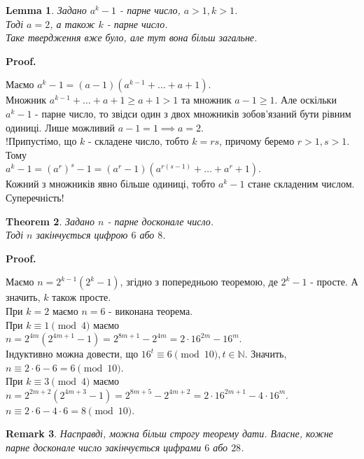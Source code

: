 \documentclass[a4paper, 10pt]{article}
\makeatletter
\theoremstyle{theoremdd}
\newtheorem{theorem}{Theorem}[subsection]
\theoremstyle{theoremdd}
\theoremstyle{theoremdd}
\theoremstyle{theoremdd}
\theoremstyle{theoremdd}
\theoremstyle{theoremdd}
\newtheorem{remark}[theorem]{Remark}
\theoremstyle{theoremdd}
\newtheorem{lemma}[theorem]{Lemma}
\theoremstyle{theoremdd}
\renewenvironment{proof}[1][Proof.\\]{\par
\pushQED{\hfill \qed}%
\normalfont \topsep6\p@\@plus6\p@\relax
\trivlist
\item\relax
{\bfseries
#1\@addpunct{.}}\hspace\labelsep\ignorespaces
}{%
\popQED\endtrivlist\@endpefalse
}
\makeatother
\begin{document}
\begin{lemma}
Задано $a^k-1$ - парне число, $a>1, k>1$.\\
Тоді $a = 2$, а також $k$ - парне число.\\
\textit{Таке твердження вже було, але тут вона більш загальне.}
\end{lemma}

\begin{proof}
Маємо $a^k-1=(a-1)(a^{k-1}+\dots+a+1).$\\
Множник $a^{k-1}+\dots +a+1 \geq a+1>1$ та множник $a-1\geq 1$. Але оскільки $a^k-1$ - парне число, то звідси один з двох множників зобов'язаний бути рівним одиниці. Лише можливий $a-1=1 \implies a =2$.\\
!Припустімо, що $k$ - складене число, тобто $k = rs$, причому беремо $r>1,s>1$. Тому\\
$a^k-1=(a^r)^s-1 = (a^r-1)(a^{r(s-1)}+ \dots + a^r+1)$.\\
Кожний з множників явно більше одиниці, тобто $a^k-1$ стане складеним числом. Суперечність!
\end{proof}

\begin{theorem}
Задано $n$ - парне досконале число.\\
Тоді $n$ закінчується цифрою $6$ або $8$.
\end{theorem}

\begin{proof}
Маємо $n = 2^{k-1}(2^k-1)$, згідно з попередньою теоремою, де $2^k-1$ - просте. А значить, $k$ також просте.\\
При $k = 2$ маємо $n = 6$ - виконана теорема.\\
При $k \equiv 1 \pmod 4$ маємо\\
$n = 2^{4m}(2^{4m+1}-1) = 2^{8m+1} - 2^{4m} = 2 \cdot 16^{2m} - 16^m$.\\
Індуктивно можна довести, що $16^t \equiv 6 \pmod {10}, t \in \mathbb{N}$. Значить, \\
$n \equiv 2 \cdot 6 - 6 = 6 \pmod {10}$.\\
При $k \equiv 3 \pmod 4$ маємо\\
$n = 2^{2m+2}(2^{4m+3}-1) = 2^{8m+5} - 2^{4m+2} = 2 \cdot 16^{2m+1} - 4 \cdot 16^m$.\\
$n \equiv 2 \cdot 6 - 4 \cdot 6 = 8 \pmod {10}$.
\end{proof}

\begin{remark}
Насправді, можна більш строгу теорему дати. Власне, кожне парне досконале число закінчується цифрами $6$ або $28$.

\end{remark}
\end{document}
